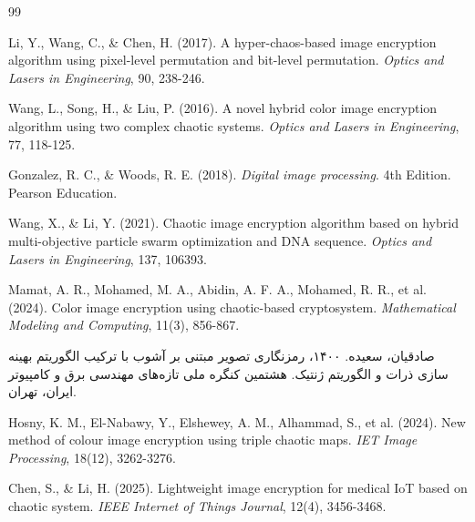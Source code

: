 \begin{thebibliography}{99}
\begin{LTRbibitems}
 Li, Y., Wang, C., \& Chen, H. (2017). A hyper-chaos-based image encryption algorithm using pixel-level permutation and bit-level permutation. \textit{Optics and Lasers in Engineering}, 90, 238-246.
\end{LTRbibitems}

\begin{LTRbibitems}
 Wang, L., Song, H., \& Liu, P. (2016). A novel hybrid color image encryption algorithm using two complex chaotic systems. \textit{Optics and Lasers in Engineering}, 77, 118-125.
\end{LTRbibitems}

\begin{LTRbibitems}
 Gonzalez, R. C., \& Woods, R. E. (2018). \textit{Digital image processing}. 4th Edition. Pearson Education.
\end{LTRbibitems}

\begin{LTRbibitems}
 Wang, X., \& Li, Y. (2021). Chaotic image encryption algorithm based on hybrid multi-objective particle swarm optimization and DNA sequence. \textit{Optics and Lasers in Engineering}, 137, 106393.
\end{LTRbibitems}

\begin{LTRbibitems}
 Mamat, A. R., Mohamed, M. A., Abidin, A. F. A., Mohamed, R. R., et al. (2024). Color image encryption using chaotic-based cryptosystem. \textit{Mathematical Modeling and Computing}, 11(3), 856-867.
\end{LTRbibitems}

 صادقیان، سعیده. ۱۴۰۰، رمزنگاری تصویر مبتنی بر آشوب با ترکیب الگوریتم بهینه سازی ذرات و الگوریتم ژنتیک. هشتمین کنگره ملی تازه‌های مهندسی برق و کامپیوتر ایران، تهران.

\begin{LTRbibitems}
 Hosny, K. M., El-Nabawy, Y., Elshewey, A. M., Alhammad, S., et al. (2024). New method of colour image encryption using triple chaotic maps. \textit{IET Image Processing}, 18(12), 3262-3276.
\end{LTRbibitems}

\begin{LTRbibitems}
 Chen, S., \& Li, H. (2025). Lightweight image encryption for medical IoT based on chaotic system. \textit{IEEE Internet of Things Journal}, 12(4), 3456-3468.
\end{LTRbibitems}


\end{thebibliography}
